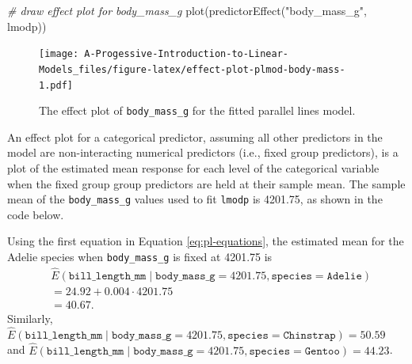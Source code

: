 \documentclass[
]{book}
\newenvironment{Shaded}{\begin{snugshade}}{\end{snugshade}}
\newcommand{\CommentTok}[1]{\textcolor[rgb]{0.56,0.35,0.01}{\textit{#1}}}
\newcommand{\DocumentationTok}[1]{\textcolor[rgb]{0.56,0.35,0.01}{\textbf{\textit{#1}}}}
\newcommand{\FunctionTok}[1]{\textcolor[rgb]{0.00,0.00,0.00}{#1}}
\newcommand{\NormalTok}[1]{#1}
\newcommand{\SpecialCharTok}[1]{\textcolor[rgb]{0.00,0.00,0.00}{#1}}
\newcommand{\StringTok}[1]{\textcolor[rgb]{0.31,0.60,0.02}{#1}}
\theoremstyle{definition}
\theoremstyle{definition}
\theoremstyle{definition}
\theoremstyle{definition}
\theoremstyle{remark}
\begin{document}
\begin{Shaded}
\begin{Highlighting}[]
\CommentTok{\# draw effect plot for body\_mass\_g}
\FunctionTok{plot}\NormalTok{(}\FunctionTok{predictorEffect}\NormalTok{(}\StringTok{"body\_mass\_g"}\NormalTok{, lmodp))}
\end{Highlighting}
\end{Shaded}

\begin{figure}
\centering
\texttt{[image: A-Progessive-Introduction-to-Linear-Models\_files/figure-latex/effect-plot-plmod-body-mass-1.pdf]}
\caption{\label{fig:effect-plot-plmod-body-mass}The effect plot of \texttt{body\_mass\_g} for the fitted parallel lines model.}
\end{figure}

An effect plot for a categorical predictor, assuming all other
predictors in the model are non-interacting numerical predictors (i.e.,
fixed group predictors), is a plot of the estimated mean response for
each level of the categorical variable when the fixed group group
predictors are held at their sample mean. The sample mean of the
\texttt{body\_mass\_g} values used to fit \texttt{lmodp} is 4201.75, as shown in the
code below.

\begin{Shaded}
\end{Shaded}

Using the first equation in Equation \eqref{eq:pl-equations}, the
estimated mean for the Adelie species when \texttt{body\_mass\_g} is fixed at
4201.75 is \[
\begin{aligned}
&\hat{E}(\mathtt{bill\_length\_mm} \mid \mathtt{body\_mass\_g} = 4201.75, \mathtt{species}=\mathtt{Adelie}) \\
&= 24.92 + 0.004 \cdot 4201.75 \\
&= 40.67.
\end{aligned}
\] Similarly,
\(\hat{E}(\mathtt{bill\_length\_mm} \mid \mathtt{body\_mass\_g} = 4201.75, \mathtt{species}=\mathtt{Chinstrap}) = 50.59\)
and
\(\hat{E}(\mathtt{bill\_length\_mm} \mid \mathtt{body\_mass\_g} = 4201.75, \mathtt{species}=\mathtt{Gentoo}) = 44.23\).
\end{document}
